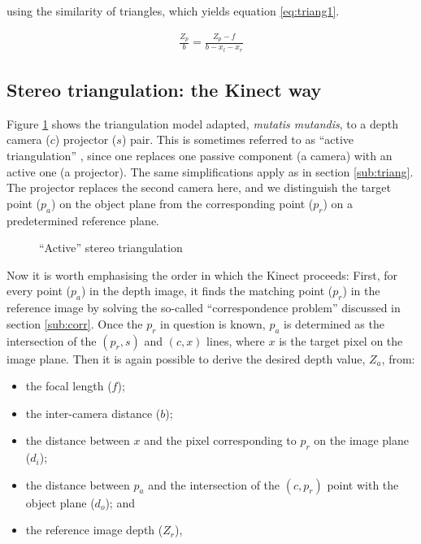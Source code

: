 using the similarity of triangles, which yields equation
\ref{eq:triang1}.

\begin{align} \label{eq:triang1}
    \frac{Z_p}{b} = \frac{Z_p - f}{b - x_l - x_r}
\end{align}


\subsection{Stereo triangulation: the Kinect way}

Figure \ref{fig:atriang} shows the triangulation model adapted, \emph{mutatis
mutandis}, to a depth camera ($c$) projector ($s$) pair. This is sometimes
referred to as ``active triangulation'' \cite{alexander1987}, since one replaces
one passive component (a camera) with an active one (a projector). The same
simplifications apply as in section \ref{sub:triang}. The projector replaces the
second camera here, and we distinguish the target point ($p_a$) on the object
plane from the corresponding point ($p_r$) on a predetermined reference plane.

\begin{figure}[ht]
    \begin{center}
        
        \caption{``Active'' stereo triangulation}
        \label{fig:atriang}
    \end{center}
\end{figure}

Now it is worth emphasising the order in which the Kinect proceeds: First, for
every point ($p_a$) in the depth image, it finds the matching point ($p_r$) in
the reference image by solving the so-called ``correspondence problem''
discussed in section \ref{sub:corr}. Once the $p_r$ in question is known, $p_a$
is determined as the intersection of the $(p_r,s)$ and $(c,x)$ lines, where $x$
is the target pixel on the image plane. Then it is again possible to derive the
desired depth value, $Z_a$, from:

\begin{itemize}

    \item the focal length ($f$);

    \item the inter-camera distance ($b$);

    \item the distance between $x$ and the pixel corresponding to $p_r$ on the
    image plane ($d_i$);

    \item the distance between $p_a$ and the intersection of the $(c,p_r)$ point
    with the object plane ($d_o$); and

    \item the reference image depth ($Z_r$),

\end{itemize}

